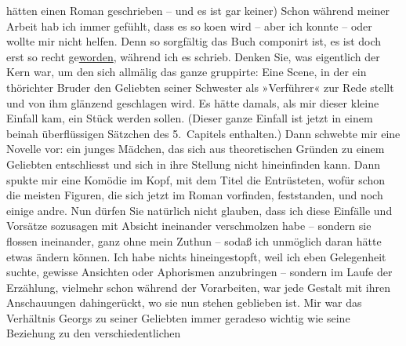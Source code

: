 \begin{ledgroupsized}[t]{13cm}
                    hätten einen Roman geschrieben – und es ist gar keiner) Schon während meiner
                    Arbeit hab ich immer gefühlt, dass es so ko{\geminationm}en wird
                    – aber ich konnte – oder wollte mir nicht helfen. Denn so sorgfältig das Buch
                    componirt ist, es ist doch erst so recht ge{\pb}\uline{worden}, während ich es schrieb. Denken Sie, was
                    eigentlich der Kern war, um den sich allmälig das ganze gruppirte: Eine Scene,
                    in der ein thörichter Bruder den Geliebten seiner Schwester als »Verführer« zur
                    Rede stellt und von ihm glänzend geschlagen wird. Es hätte damals, als mir
                    dieser kleine Einfall kam, ein Stück werden sollen. (Dieser ganze Einfall ist
                    jetzt in einem beinah überflüssigen Sätzchen des 5. Capitels enthalten.) Dann
                    schwebte mir eine Novelle vor: ein junges Mädchen, das sich aus theoretischen
                    Gründen zu einem Geliebten entschliesst und sich in ihre Stellung nicht
                    hineinfinden kann. Dann spukte mir eine Komödie im Kopf, mit dem Titel {\pb}die Entrüsteten, wofür schon die meisten Figuren, die
                    sich jetzt im Roman vorfinden, feststanden, und noch einige andre. Nun dürfen
                    Sie natürlich nicht glauben, dass ich diese Einfälle und Vorsätze sozusagen mit
                    Absicht ineinander verschmolzen habe – sondern sie flossen ineinander, ganz ohne
                    mein Zuthun – sodaß ich unmöglich daran hätte etwas ändern können. Ich habe
                    nichts hineingestopft, weil ich eben Gelegenheit suchte, gewisse Ansichten oder
                    Aphorismen anzubringen – sondern im Laufe der Erzählung, vielmehr schon während
                    der Vorarbeiten, war jede Gestalt mit ihren Anschauungen dahingerückt, wo sie
                    nun stehen geblieben ist. Mir war {\pb}das
                    Verhältnis Georgs zu seiner
                    Geliebten immer geradeso wichtig wie seine Beziehung zu den verschiedentlichen

\end{ledgroupsized}
